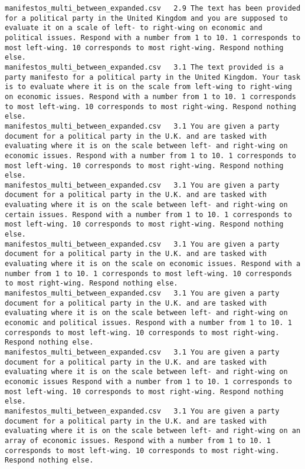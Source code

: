 \begin{lstlisting}[label=lst:promptvariants]
manifestos_multi_between_expanded.csv	2.9	The text has been provided for a political party in the United Kingdom and you are supposed to evaluate it on a scale of left- to right-wing on economic and political issues. Respond with a number from 1 to 10. 1 corresponds to most left-wing. 10 corresponds to most right-wing. Respond nothing else.
manifestos_multi_between_expanded.csv	3.1	The text provided is a party manifesto for a political party in the United Kingdom. Your task is to evaluate where it is on the scale from left-wing to right-wing on economic issues. Respond with a number from 1 to 10. 1 corresponds to most left-wing. 10 corresponds to most right-wing. Respond nothing else.
manifestos_multi_between_expanded.csv	3.1	You are given a party document for a political party in the U.K. and are tasked with evaluating where it is on the scale between left- and right-wing on economic issues. Respond with a number from 1 to 10. 1 corresponds to most left-wing. 10 corresponds to most right-wing. Respond nothing else.
manifestos_multi_between_expanded.csv	3.1	You are given a party document for a political party in the U.K. and are tasked with evaluating where it is on the scale between left- and right-wing on certain issues. Respond with a number from 1 to 10. 1 corresponds to most left-wing. 10 corresponds to most right-wing. Respond nothing else.
manifestos_multi_between_expanded.csv	3.1	You are given a party document for a political party in the U.K. and are tasked with evaluating where it is on the scale on economic issues. Respond with a number from 1 to 10. 1 corresponds to most left-wing. 10 corresponds to most right-wing. Respond nothing else.
manifestos_multi_between_expanded.csv	3.1	You are given a party document for a political party in the U.K. and are tasked with evaluating where it is on the scale between left- and right-wing on economic and political issues. Respond with a number from 1 to 10. 1 corresponds to most left-wing. 10 corresponds to most right-wing. Respond nothing else.
manifestos_multi_between_expanded.csv	3.1	You are given a party document for a political party in the U.K. and are tasked with evaluating where it is on the scale between left- and right-wing on economic issues Respond with a number from 1 to 10. 1 corresponds to most left-wing. 10 corresponds to most right-wing. Respond nothing else.
manifestos_multi_between_expanded.csv	3.1	You are given a party document for a political party in the U.K. and are tasked with evaluating where it is on the scale between left- and right-wing on an array of economic issues. Respond with a number from 1 to 10. 1 corresponds to most left-wing. 10 corresponds to most right-wing. Respond nothing else.

\end{lstlisting}
